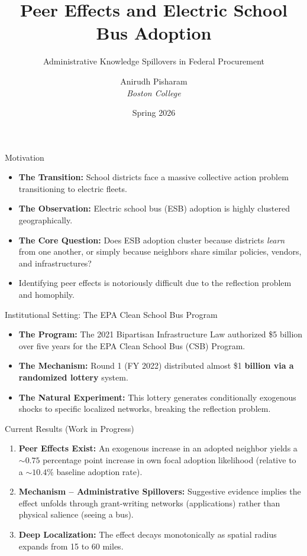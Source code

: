 \documentclass[aspectratio=169]{beamer}
\title[ESB Peer Effects]{Peer Effects and Electric School Bus Adoption}
\subtitle{Administrative Knowledge Spillovers in Federal Procurement}
\author[Pisharam]{Anirudh Pisharam \\ \textit{Boston College}}
\date{Spring 2026}
\begin{document}
\begin{frame}
    \titlepage
\end{frame}


\begin{frame}{Motivation}
    \begin{itemize}
        \item \textbf{The Transition:} School districts face a massive collective action problem transitioning to electric fleets. 
        \item \textbf{The Observation:} Electric school bus (ESB) adoption is highly clustered geographically.
        \item \textbf{The Core Question:} Does ESB adoption cluster because districts \textit{learn} from one another, or simply because neighbors share similar policies, vendors, and infrastructures?
        \vspace{0.5cm}
        \item Identifying peer effects is notoriously difficult due to the reflection problem and homophily.
    \end{itemize}
\end{frame}

\begin{frame}{Institutional Setting: The EPA Clean School Bus Program}
    \begin{itemize}
        \item \textbf{The Program:} The 2021 Bipartisan Infrastructure Law authorized \$5 billion over five years for the EPA Clean School Bus (CSB) Program.
        \item \textbf{The Mechanism:} Round 1 (FY 2022) distributed almost \$1 \textbf{billion via a randomized lottery} system.
        \item \textbf{The Natural Experiment:} This lottery generates conditionally exogenous shocks to specific localized networks, breaking the reflection problem. 
    \end{itemize}
\end{frame}

\begin{frame}{Current Results (Work in Progress)}
    \begin{enumerate}
        \item \textbf{Peer Effects Exist:} An exogenous increase in an adopted neighbor yields a $\sim 0.75$ percentage point increase in own focal adoption likelihood (relative to a $\sim 10.4\%$ baseline adoption rate).
        \item \textbf{Mechanism -- Administrative Spillovers:} Suggestive evidence implies the effect unfolds through grant-writing networks (applications) rather than physical salience (seeing a bus).
        \item \textbf{Deep Localization:} The effect decays monotonically as spatial radius expands from 15 to 60 miles.
    \end{enumerate}
\end{frame}
\end{document}
